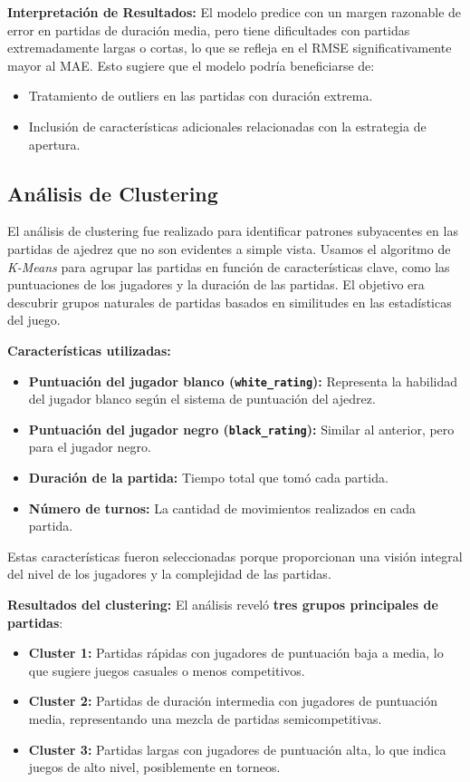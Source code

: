 \documentclass[a4paper,12pt]{article}
\begin{document}
\textbf{Interpretación de Resultados:}
El modelo predice con un margen razonable de error en partidas de duración media, pero tiene dificultades con partidas extremadamente largas o cortas, lo que se refleja en el RMSE significativamente mayor al MAE. Esto sugiere que el modelo podría beneficiarse de:
\begin{itemize}
    \item Tratamiento de outliers en las partidas con duración extrema.
    \item Inclusión de características adicionales relacionadas con la estrategia de apertura.
\end{itemize}

\newpage

\subsection{Análisis de Clustering}

El análisis de clustering fue realizado para identificar patrones subyacentes en las partidas de ajedrez que no son evidentes a simple vista. Usamos el algoritmo de \textit{K-Means} para agrupar las partidas en función de características clave, como las puntuaciones de los jugadores y la duración de las partidas. El objetivo era descubrir grupos naturales de partidas basados en similitudes en las estadísticas del juego.

\textbf{Características utilizadas:}
\begin{itemize}
    \item \textbf{Puntuación del jugador blanco (\texttt{white\_rating}):} Representa la habilidad del jugador blanco según el sistema de puntuación del ajedrez.
    \item \textbf{Puntuación del jugador negro (\texttt{black\_rating}):} Similar al anterior, pero para el jugador negro.
    \item \textbf{Duración de la partida:} Tiempo total que tomó cada partida.
    \item \textbf{Número de turnos:} La cantidad de movimientos realizados en cada partida.
\end{itemize}

Estas características fueron seleccionadas porque proporcionan una visión integral del nivel de los jugadores y la complejidad de las partidas.

\textbf{Resultados del clustering:} El análisis reveló \textbf{tres grupos principales de partidas}:
\begin{itemize}
    \item \textbf{Cluster 1:} Partidas rápidas con jugadores de puntuación baja a media, lo que sugiere juegos casuales o menos competitivos.
    \item \textbf{Cluster 2:} Partidas de duración intermedia con jugadores de puntuación media, representando una mezcla de partidas semicompetitivas.
    \item \textbf{Cluster 3:} Partidas largas con jugadores de puntuación alta, lo que indica juegos de alto nivel, posiblemente en torneos.
\end{itemize}
\end{document}
